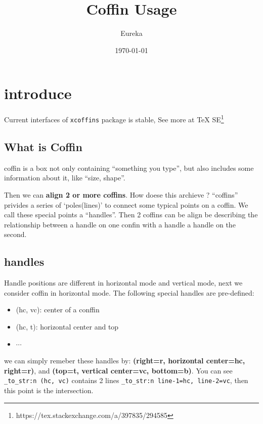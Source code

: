 \documentclass[
    lang=en, 
    class=article,
    classOption={11pt},
    toc={redef}
]{zlatex}
\title{Coffin Usage}
\author{Eureka}
\date{\today}
\begin{document}
\pagestyle{fancy}
\maketitle
\tableofcontents
\bigskip

\ExplSyntaxOn
\newcommand{\cmd}[1]{ \texttt{\tl_to_str:n {#1}}}
\newcommand{\usecoffin}[1]{\fbox{\TypesetCoffin #1}}
\newcommand{\pp}{\par\vspace*{2em}}
\ExplSyntaxOff
\section{introduce}
Current interfaces of \texttt{xcoffins} package is stable, See more at \TeX{} SE\footnote[1]{https://tex.stackexchange.com/a/397835/294585}

\subsection{What is Coffin}
coffin is a box not only containing ``something you type'', but also includes 
some information about it, like ``size, shape''.

Then we can \textbf{align 2 or more coffins}. How doese this archieve ? ``coffins''
privides a series of `poles(lines)' to connect some typical points on a coffin. We call these 
special points a ``handles''. Then 2 coffins can be align be describing the relationship between 
a handle on one confin with a handle a handle on the second.


\subsection{handles}
Handle positions are different in horizontal mode and vertical mode, next we consider coffin 
in horizontal mode. The following special handles are pre-defined: 
\begin{itemize}
    \item (hc, vc): center of a conffin
    \item (hc, t): horizontal center and top
    \item $\cdots$ 
\end{itemize}

we can simply remeber these handles by: \textbf{(right=r, horizontal center=hc, right=r)},
and \textbf{(top=t, vertical center=vc, bottom=b)}. You can see \cmd{(hc, vc)} contains 
2 lines \cmd{line-1=hc, line-2=vc}, then this point is the intersection.
\end{document}
